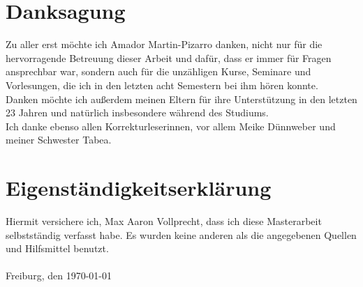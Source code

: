 \chapter*{Danksagung}
Zu aller erst möchte ich Amador Martin-Pizarro danken, nicht nur für die hervorragende Betreuung dieser Arbeit und dafür, dass er immer für Fragen ansprechbar war, sondern auch für die unzähligen Kurse, Seminare und Vorlesungen, die ich in den letzten acht Semestern bei ihm hören konnte.\\
Danken möchte ich außerdem meinen Eltern für ihre Unterstützung in den letzten 23 Jahren und natürlich insbesondere während des Studiums.\\
Ich danke ebenso allen Korrekturleserinnen, vor allem Meike Dünnweber und meiner Schwester Tabea.
\chapter*{Eigenständigkeitserklärung}
\vspace{0.8cm}
Hiermit versichere ich, Max Aaron Vollprecht, dass ich diese Masterarbeit selbstständig verfasst habe. Es wurden keine anderen als die angegebenen Quellen und Hilfsmittel benutzt.
\\ \\
Freiburg, den \today

\newpage
\thispagestyle{empty}
\mbox{}
\newpage

